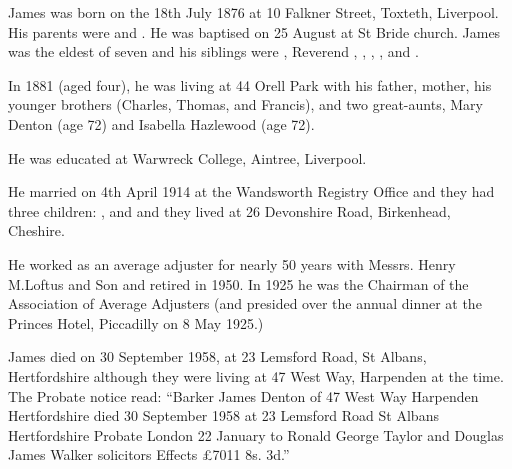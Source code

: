 
James was born on the 18th July 1876 at 10 Falkner Street, Toxteth, Liverpool\cite{JamesDBarkerBirth}.
His parents were  and . He was baptised on 25 August at St Bride church.\cite{JamesDentonBarkerBaptism} James was the eldest of seven and his siblings were , Reverend , , , , and .

In 1881 (aged four), he was living at 44 Orell Park with his father, mother, his younger brothers (Charles, Thomas, and Francis), and two great-aunts, Mary Denton (age 72) and Isabella Hazlewood (age 72).\cite{UKCensusRG11_3688}

He was educated at Warwreck College, Aintree, Liverpool.

He married  on 4th April 1914 at the Wandsworth Registry Office \cite{JamesDBarkerMarriage} and they had three children: ,  and  and they lived at 26 Devonshire Road, Birkenhead, Cheshire.

He worked as an average adjuster for nearly 50 years with Messrs. Henry M.Loftus and Son and retired in 1950. In 1925 he was the Chairman of the Association of Average Adjusters (and presided over the annual dinner at the Princes Hotel, Piccadilly on 8 May 1925.)

James died on 30 September 1958, at 23 Lemsford Road, St Albans, Hertfordshire \cite{JamesDBarkerDeath} although they were living at 47 West Way, Harpenden at the time. The Probate notice read: ``Barker James Denton of 47 West Way Harpenden Hertfordshire died 30 September 1958 at 23 Lemsford Road St Albans Hertfordshire Probate London 22 January to Ronald George Taylor and Douglas James Walker solicitors Effects £7011 8s. 3d.''
